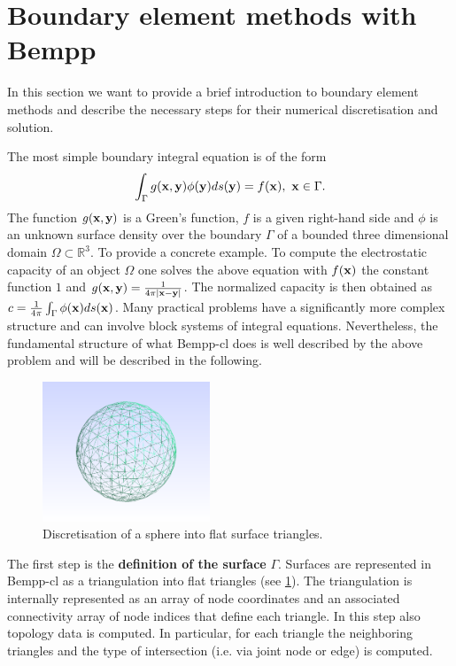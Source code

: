 \section{Boundary element methods with Bempp}
In this section we want to provide a brief introduction to boundary element methods and describe the necessary steps for their numerical discretisation and solution.

The most simple boundary integral equation is of the form
\begin{equation}
	\label{eq:bnd_integral}
	\int_{\Gamma} g(\bx, \by)\phi(\by)ds(\by) = f(\bx),~\bx\in\Gamma.
\end{equation}
The function $g(\mathbf{x}, \mathbf{y})$ is a Green's function, $f$ is a given right-hand side and $\phi$ is an unknown surface density over the boundary $\Gamma$ of a bounded three dimensional domain $\Omega\subset\mathbb{R}^3$. To provide a concrete example. To compute the electrostatic capacity of an object $\Omega$ one solves the above equation with $f(\mathbf{x})$ the constant function $1$ and $g(\mathbf{x},\mathbf{y})=\frac{1}{4\pi|\mathbf{x} - \mathbf{y}|}$. The normalized capacity is then obtained as $c = \frac{1}{4\pi}\int_{\Gamma}\phi(\mathbf{x})ds(\mathbf{x})$. Many practical problems have a significantly more complex structure and can involve block systems of integral equations. Nevertheless, the fundamental structure of what Bempp-cl does is well described by the above problem and will be described in the following.

\begin{figure}
	\center
	\includegraphics[width=5cm]{img/sphere}
	\caption{Discretisation of a sphere into flat surface triangles.}
		\label{fig:triangulation}

\end{figure}

The first step is the \textbf{definition of the surface} $\Gamma$. Surfaces are represented in Bempp-cl as a triangulation into flat triangles (see \ref{fig:triangulation}). The triangulation is internally represented as an array of node coordinates and an associated connectivity array of node indices that define each triangle. In this step also topology data is computed. In particular, for each triangle the neighboring triangles and the type of intersection (i.e. via joint node or edge) is computed.

